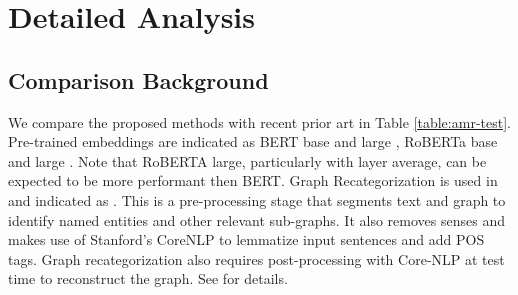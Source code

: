\documentclass[11pt,a4paper]{article}
\begin{document}
\begin{table}[h]
  \centering
{}
  \caption{Dev-set Smatch for AMR1.0 and AMR2.0. for the baseline parser and synthetic AMR training. Average results for  seeds with standard deviation.}
  \label{tab:pretrainingcorpus}
\end{table}

 

\section{Detailed Analysis}
\label{section:final}
\subsection{Comparison Background}

We compare the proposed methods with recent prior art in Table \ref{table:amr-test}. Pre-trained embeddings are indicated as BERT base and large \cite{devlin-etal-2019-bert}, RoBERTa base and large \cite{liu2019roberta}. Note that RoBERTA large, particularly with layer average, can be expected to be more performant then BERT. Graph Recategorization is used in \cite{lyu2018amr,zhang2019broad} and indicated as . This is a pre-processing stage that segments text and graph to identify named entities and other relevant sub-graphs. It also removes senses and makes use of Stanford's CoreNLP to lemmatize input sentences and add POS tags. Graph recategorization also requires post-processing with Core-NLP at test time to reconstruct the graph. See \cite[Sec.~6]{zhang2019broad} for details. 
\end{document}
